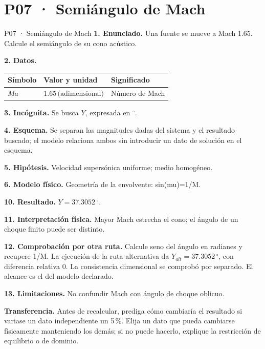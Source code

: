 \chapter*{P07 · Semiángulo de Mach}
\begin{studiumworked}{P07 · Semiángulo de Mach}
\textbf{1. Enunciado.} Una fuente se mueve a Mach 1.65. Calcule el semiángulo de su cono acústico.

\textbf{2. Datos.}
\begin{longtable}{p{.16\linewidth}p{.35\linewidth}p{.38\linewidth}}\toprule Símbolo & Valor y unidad & Significado\\\midrule\endhead
$Ma$ & $1.65\,\text{(adimensional)}$ & Número de Mach\\
\bottomrule\end{longtable}
\textbf{3. Incógnita.} Se busca $Y$, expresada en ${}^\circ$.

\textbf{4. Esquema.} Se separan las magnitudes dadas del sistema y el resultado buscado; el modelo relaciona ambos sin introducir un dato de solución en el esquema.

\textbf{5. Hipótesis.} Velocidad supersónica uniforme; medio homogéneo.

\textbf{6. Modelo físico.} Geometría de la envolvente: sin(mu)=1/M.


\textbf{10. Resultado.} $Y=37.3052\,{}^\circ$.

\textbf{11. Interpretación física.} Mayor Mach estrecha el cono; el ángulo de un choque finito puede ser distinto.

\textbf{12. Comprobación por otra ruta.} Calcule seno del ángulo en radianes y recupere 1/M. La ejecución de la ruta alternativa da $Y_{alt}=37.3052\,{}^\circ$, con diferencia relativa $0$. La consistencia dimensional se comprobó por separado. El alcance es el del modelo declarado.

\textbf{13. Limitaciones.} No confundir Mach con ángulo de choque oblicuo.

\textbf{Transferencia.} Antes de recalcular, prediga cómo cambiaría el resultado si variase un dato independiente un 5\,\%. Elija un dato que pueda cambiarse físicamente manteniendo los demás; si no puede hacerlo, explique la restricción de equilibrio o de dominio.\par
\end{studiumworked}
